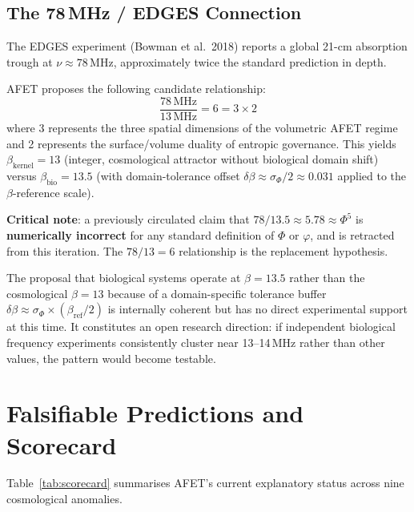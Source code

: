 \documentclass[12pt,a4paper]{article}
\theoremstyle{definition}
\newcommand{\betaref}{\beta_{\mathrm{ref}}}
\newcommand{\sigphi}{\sigma_{\Phi}}
\newcommand{\phigold}{\varphi}   %
\newcommand{\PhiAFET}{\Phi}      %
\begin{document}
\subsection{The 78\,MHz / EDGES Connection}

\begin{hypothesis}
The EDGES experiment (Bowman et al.\ 2018) reports a global 21-cm absorption
trough at $\nu \approx 78\,\mathrm{MHz}$, approximately twice the standard
prediction in depth.

AFET proposes the following candidate relationship:
\[
  \frac{78\,\mathrm{MHz}}{13\,\mathrm{MHz}} = 6 = 3 \times 2
\]
where 3 represents the three spatial dimensions of the volumetric AFET regime
and 2 represents the surface/volume duality of entropic governance.
This yields $\beta_{\mathrm{kernel}} = 13$ (integer, cosmological attractor
without biological domain shift) versus $\beta_{\mathrm{bio}} = 13.5$
(with domain-tolerance offset $\delta\beta \approx \sigphi/2 \approx 0.031$
applied to the $\beta$-reference scale).

\textbf{Critical note}: a previously circulated claim that
$78/13.5 \approx 5.78 \approx \PhiAFET^5$ is \textbf{numerically incorrect}
for any standard definition of $\PhiAFET$ or $\phigold$, and is retracted
from this iteration. The $78/13 = 6$ relationship is the replacement hypothesis.
\end{hypothesis}

\begin{speculative}
The proposal that biological systems operate at $\beta = 13.5$ rather than
the cosmological $\beta = 13$ because of a domain-specific tolerance buffer
$\delta\beta \approx \sigphi \times (\betaref/2)$ is internally coherent but
has no direct experimental support at this time.
It constitutes an open research direction: if independent biological frequency
experiments consistently cluster near 13--14\,MHz rather than other values, the
pattern would become testable.
\end{speculative}

\section{Falsifiable Predictions and Scorecard}

Table~\ref{tab:scorecard} summarises AFET's current explanatory status
across nine cosmological anomalies.
\end{document}
